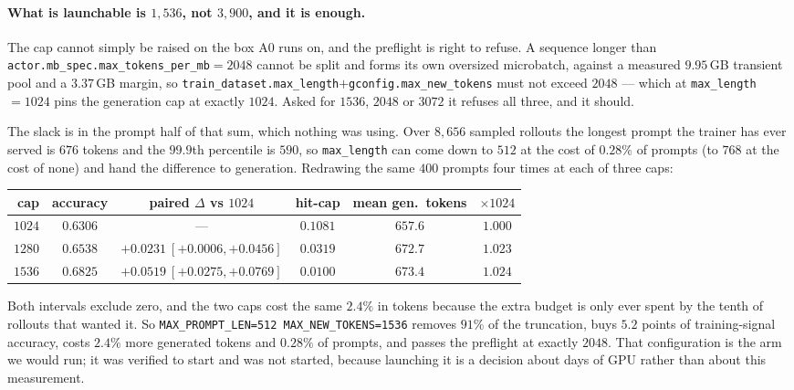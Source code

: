 \paragraph{What is launchable is $1{,}536$, not $3{,}900$, and it is enough.} The cap
cannot simply be raised on the box A0 runs on, and the preflight is right to refuse. A
sequence longer than \texttt{actor.mb\_spec.max\_tokens\_per\_mb}$=2048$ cannot be split and
forms its own oversized microbatch, against a measured $9.95$\,GB transient pool and a
$3.37$\,GB margin, so \texttt{train\_dataset.max\_length}$+$\texttt{gconfig.max\_new\_tokens}
must not exceed $2048$ --- which at \texttt{max\_length}$=1024$ pins the generation cap at
exactly $1024$. Asked for $1536$, $2048$ or $3072$ it refuses all three, and it should.

The slack is in the prompt half of that sum, which nothing was using. Over $8{,}656$ sampled
rollouts the longest prompt the trainer has ever served is $676$ tokens and the $99.9$th
percentile is $590$, so \texttt{max\_length} can come down to $512$ at the cost of $0.28\%$
of prompts (to $768$ at the cost of none) and hand the difference to generation. Redrawing
the same $400$ prompts four times at each of three caps:

\begin{center}\small
\begin{tabular}{rccccc}
\toprule
cap & accuracy & paired $\Delta$ vs $1024$ & hit-cap & mean gen.\ tokens & $\times1024$ \\
\midrule
$1024$ & $0.6306$ & --- & $0.1081$ & $657.6$ & $1.000$ \\
$1280$ & $0.6538$ & $+0.0231\ [+0.0006,+0.0456]$ & $0.0319$ & $672.7$ & $1.023$ \\
$1536$ & $0.6825$ & $+0.0519\ [+0.0275,+0.0769]$ & $0.0100$ & $673.4$ & $1.024$ \\
\bottomrule
\end{tabular}
\end{center}

\noindent Both intervals exclude zero, and the two caps cost the same $2.4\%$ in tokens
because the extra budget is only ever spent by the tenth of rollouts that wanted it. So
\texttt{MAX\_PROMPT\_LEN=512 MAX\_NEW\_TOKENS=1536} removes $91\%$ of the truncation, buys
$5.2$ points of training-signal accuracy, costs $2.4\%$ more generated tokens and $0.28\%$ of
prompts, and passes the preflight at exactly $2048$. That configuration is the arm we would
run; it was verified to start and was not started, because launching it is a decision about
days of GPU rather than about this measurement.

